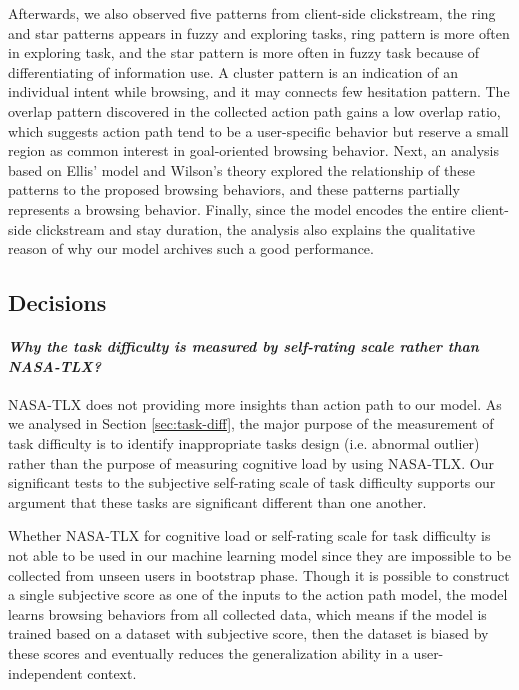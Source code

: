 Afterwards, we also observed five patterns from client-side clickstream, the ring and star patterns
appears in fuzzy and exploring tasks, ring pattern is more often in exploring task,
and the star pattern is more often in fuzzy task because of differentiating of information use.
A cluster pattern is an indication of an individual intent while browsing, and it may connects
few hesitation pattern.
The overlap pattern discovered in the collected action path gains a low overlap ratio,
which suggests action path tend to be a user-specific behavior but reserve a small region as
common interest in goal-oriented browsing behavior.
Next, an analysis based on Ellis' model and Wilson's theory explored the relationship 
of these patterns to the proposed browsing behaviors, and these patterns partially represents a browsing behavior.
Finally, since the model encodes the entire client-side clickstream and stay duration,
the analysis also explains the qualitative reason of why our model archives such a good performance.

\subsection{Decisions}
\label{sec:decision}

\paragraph{\emph{Why the task difficulty is measured by self-rating scale rather than NASA-TLX?}}

NASA-TLX does not providing more insights than action path to our model.
As we analysed in Section \ref{sec:task-diff}, the major purpose of the measurement of 
task difficulty is to identify inappropriate tasks design (i.e. abnormal outlier) 
rather than the purpose of measuring cognitive load by using NASA-TLX.
Our significant tests to the subjective self-rating scale of task difficulty supports
our argument that these tasks are significant different than one another.

Whether NASA-TLX for cognitive load or self-rating scale for task difficulty is not able to be used in
our machine learning model since they are impossible to be collected from unseen users in bootstrap phase.
Though it is possible to construct a single subjective score as one of the inputs to the action path model,
the model learns browsing behaviors from all collected data, which means if the model is trained based on 
a dataset with subjective score, then the dataset is biased by these scores and eventually reduces the 
generalization ability in a user-independent context.

